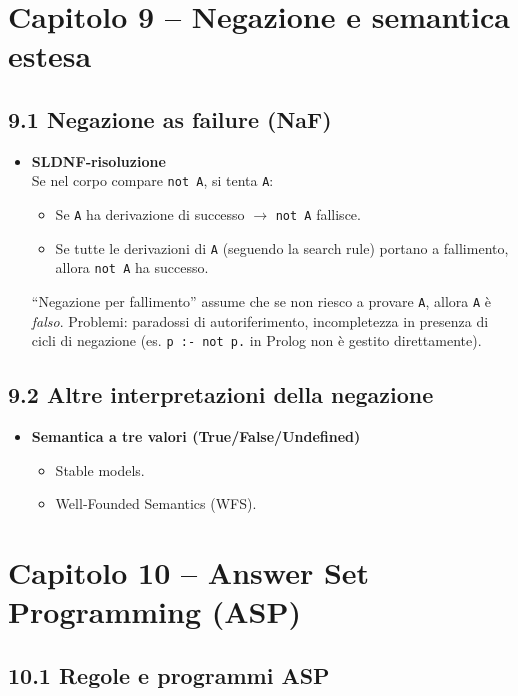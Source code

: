 \documentclass[12pt]{article}
\begin{document}
\section*{Capitolo 9 – Negazione e semantica estesa}

\subsection*{9.1 Negazione as failure (NaF)}

\begin{itemize}
  \item \textbf{SLDNF‐risoluzione}\\
    Se nel corpo compare \texttt{not A}, si tenta \texttt{A}:
    \begin{itemize}
      \item Se \texttt{A} ha derivazione di successo $\to$ \texttt{not A} fallisce.
      \item Se tutte le derivazioni di \texttt{A} (seguendo la search rule) portano a fallimento, allora \texttt{not A} ha successo.
    \end{itemize}
    “Negazione per fallimento” assume che se non riesco a provare \texttt{A}, allora \texttt{A} è \emph{falso}. Problemi: paradossi di autoriferimento, incompletezza in presenza di cicli di negazione (es. \texttt{p :- not p.} in Prolog non è gestito direttamente).
\end{itemize}

\subsection*{9.2 Altre interpretazioni della negazione}

\begin{itemize}
  \item \textbf{Semantica a tre valori (True/False/Undefined)}\\
    \begin{itemize}
      \item Stable models.
      \item Well‐Founded Semantics (WFS).
    \end{itemize}
\end{itemize}

\section*{Capitolo 10 – Answer Set Programming (ASP)}

\subsection*{10.1 Regole e programmi ASP}
\end{document}
